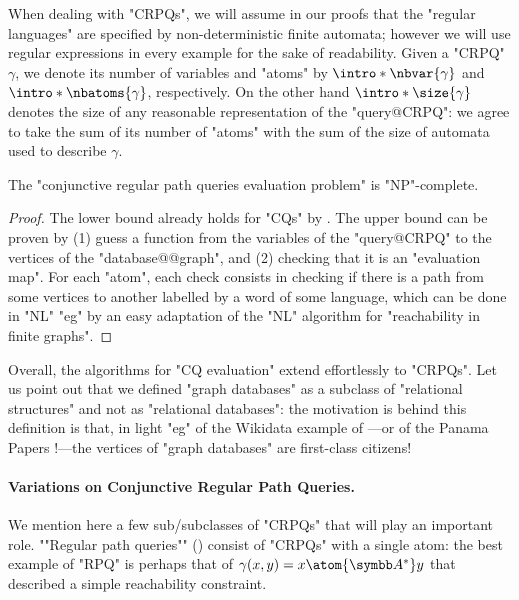 
When dealing with "CRPQs", we will assume in our proofs that the "regular languages"
are specified by non-deterministic finite automata; however we will use
regular expressions in every example for the sake of readability.
Given a "CRPQ" $\gamma$, we denote its number of variables
and "atoms" by \AP$\intro*\nbvar{\gamma}$ and $\intro*\nbatoms{\gamma}$, respectively.
On the other hand $\intro*\size{\gamma}$ denotes the size of any reasonable representation
of the "query@CRPQ": we agree to take the sum of its number of "atoms" with
the sum of the size of automata used to describe $\gamma$.

\begin{proposition}
    The "conjunctive regular path queries evaluation problem" is "NP"-complete.
\end{proposition}

\begin{proof}
    The lower bound already holds for "CQs" by .
    The upper bound can be proven by (1) guess a function from the variables
    of the "query@CRPQ" to the vertices of the "database@@graph",
    and (2) checking that it is an "evaluation map". 
    For each "atom", each check consists in checking if there is a
    path from some vertices to another labelled by a word of some language,
    which can be done in "NL" "eg" by an easy
    adaptation of the "NL" algorithm for "reachability in finite graphs".
\end{proof}


Overall, the algorithms for "CQ evaluation" extend effortlessly to "CRPQs". 
Let us point out that we defined "graph databases" as a subclass of
"relational structures" and not as "relational databases":
the motivation is behind this definition is that,
in light "eg" of the Wikidata example of ---or  
of the Panama Papers \cite{Neo4jPanama}!---the vertices of "graph databases"
are first-class citizens!

\paragraph*{Variations on Conjunctive Regular Path Queries.}
We mention here a few sub/subclasses of "CRPQs" that will play an important role.
\AP""Regular path queries"" () consist of "CRPQs" with a single atom:
the best example of "RPQ" is perhaps that of $\gamma(x,y) = x \atom{\A^*} y$
that described a simple reachability constraint.


